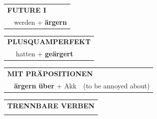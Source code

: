 \documentclass[10pt,a4paper]{revtex4-2}
\begin{document}
\begin{verbbox}
\begin{tabular}{rl}
    \multicolumn{2}{l}{\textbf{FUTURE I} }\\
   & werden + \textbf{ärgern}\\
 
  \end{tabular}
\hfill
   \begin{tabular}{rl}
      \multicolumn{2}{l}{\textbf{PLUSQUAMPERFEKT}}\\
   & hatten + \textbf{geärgert}\\
  \end{tabular}

   \vspace{10pt}

   \begin{tabular}{lll}
      \multicolumn{3}{l}{\textbf{MIT PRÄPOSITIONEN}}\\
& \textbf{ärgern über} + Akk & (to be annoyed about)\\
   \end{tabular}
  \hfill
   \begin{tabular}{lll}
      \multicolumn{3}{l}{\textbf{TRENNBARE VERBEN}}\\
\vspace{10pt}
  \end{tabular}

\vspace{-5pt}

\end{verbbox}
\end{document}
